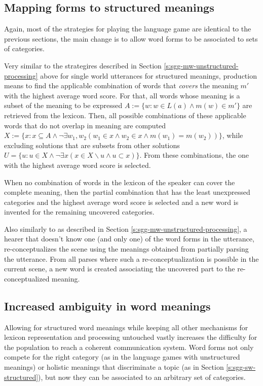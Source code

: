 \subsection{Mapping forms to structured meanings}

Again, most of the strategies for playing the language game are
identical to the previous sections, the main change is to allow word
forms to be associated to sets of categories. 

 Very similar to the strategires described in
Section \ref{s:sgg-mw-unstructured-processing} above for single world
utterances for structured meanings, production means to find the
applicable combination of words that \emph{covers} the meaning $m'$
with the highest average word score. For that, all words whose meaning
is a subset of the meaning to be expressed $A:=\{w: w \in L(a) \wedge
m(w) \in m'\}$ are retrieved from the lexicon. Then, all possible
combinations of these applicable words that do not overlap in meaning
are computed $X := \{x: x \subseteq A \wedge \neg\exists w_1,w_2 (w_1
\in x \wedge w_2 \in x \wedge m(w_1) = m(w_2))\}$, while excluding
solutions that are subsets from other solutions $U = \{u : u \in X
\wedge \neg \exists x (x \in X \backslash u \wedge u \subset
x)\}$. From these combinations, the one with the highest average word
score is selected.


 When no combination of words in the lexicon of
the speaker can cover the complete meaning, then the partial
combination that has the least unexpressed categories and the highest
average word score is selected and a new word is invented for the
remaining uncovered categories.


 Also similarly to as described in Section
\ref{s:sgg-mw-unstructured-processing}, a hearer that doesn't know one
(and only one) of the word forms in the utterance, re-conceptualizes
the scene using the meanings obtained from partially parsing the
utterance. From all parses where such a re-conceptualization is
possible in the current scene, a new word is created associating the
uncovered part to the re-conceptualized meaning.


\subsection{Increased ambiguity in word meanings}


Allowing for structured word meanings while keeping all other
mechanisms for lexicon representation and processing untouched vastly
increases the difficulty for the population to reach a coherent
communication system. Word forms not only compete for the right
category (as in the language games with unstructured meanings) or
holistic meanings that discriminate a topic (as in Section
\ref{s:sgg-sw-structured}), but now they can be associated to an
arbitrary set of categories. 

